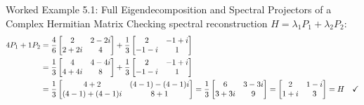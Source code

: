 \begin{examplebox}{Worked Example 5.1: Full Eigendecomposition and Spectral Projectors of a Complex Hermitian Matrix}
Checking spectral reconstruction $H = \lambda_1 P_1 + \lambda_2 P_2$:
\begin{align}
4 P_1 + 1 P_2 &= \frac{4}{6} \begin{bmatrix} 2 & 2 - 2i \\ 2 + 2i & 4 \end{bmatrix} + \frac{1}{3} \begin{bmatrix} 2 & -1 + i \\ -1 - i & 1 \end{bmatrix} \notag \\
&= \frac{1}{3} \begin{bmatrix} 4 & 4 - 4i \\ 4 + 4i & 8 \end{bmatrix} + \frac{1}{3} \begin{bmatrix} 2 & -1 + i \\ -1 - i & 1 \end{bmatrix} \notag \\
&= \frac{1}{3} \begin{bmatrix} 4 + 2 & (4 - 1) - (4 - 1)i \\ (4 - 1) + (4 - 1)i & 8 + 1 \end{bmatrix} = \frac{1}{3} \begin{bmatrix} 6 & 3 - 3i \\ 3 + 3i & 9 \end{bmatrix} = \begin{bmatrix} 2 & 1 - i \\ 1 + i & 3 \end{bmatrix} = H \quad \checkmark
\end{align}
\end{examplebox}

